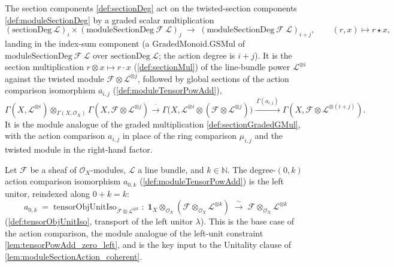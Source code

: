 \begin{definition}
  \label{def:moduleSectionGradedGSMul}
  The section components \cref{def:sectionDeg} act on the twisted-section components
  \cref{def:moduleSectionDeg} by a graded scalar multiplication
  \[
    (\mathrm{sectionDeg}\ \mathcal{L})_i \times
      (\mathrm{moduleSectionDeg}\ \mathcal{F}\ \mathcal{L})_j
    \;\longrightarrow\; (\mathrm{moduleSectionDeg}\ \mathcal{F}\ \mathcal{L})_{i+j},
    \qquad (r, x) \longmapsto r \star x,
  \]
  landing in the index-sum component (a \(\mathrm{GradedMonoid.GSMul}\) of
  \(\mathrm{moduleSectionDeg}\ \mathcal{F}\ \mathcal{L}\) over
  \(\mathrm{sectionDeg}\ \mathcal{L}\); the action degree is \(i+j\)). It is the section multiplication
  \(r \otimes x \mapsto r \cdot x\) (\cref{def:sectionMul}) of the line-bundle power
  \(\mathcal{L}^{\otimes i}\) against the twisted module
  \(\mathcal{F} \otimes \mathcal{L}^{\otimes j}\), followed by global sections of the
  action comparison isomorphism \(a_{i,j}\) (\cref{def:moduleTensorPowAdd}),
  \[
    \Gamma(X, \mathcal{L}^{\otimes i}) \otimes_{\Gamma(X,\mathcal{O}_X)}
      \Gamma(X, \mathcal{F} \otimes \mathcal{L}^{\otimes j})
    \xrightarrow{\ \cdot\ }
    \Gamma\bigl(X, \mathcal{L}^{\otimes i} \otimes
      (\mathcal{F} \otimes \mathcal{L}^{\otimes j})\bigr)
    \xrightarrow{\ \Gamma(a_{i,j})\ }
    \Gamma(X, \mathcal{F} \otimes \mathcal{L}^{\otimes (i+j)}).
  \]
  It is the module analogue of the graded multiplication \cref{def:sectionGradedGMul},
  with the action comparison \(a_{i,j}\) in place of the ring comparison
  \(\mu_{i,j}\) and the twisted module in the right-hand factor.
\end{definition}

\begin{lemma}

  \label{lem:moduleTensorPowAdd_zero_left}
  Let \(\mathcal{F}\) be a sheaf of \(\mathcal{O}_X\)-modules, \(\mathcal{L}\) a line
  bundle, and \(k \in \mathbb{N}\). The degree-\((0,k)\) action comparison
  isomorphism \(a_{0,k}\) (\cref{def:moduleTensorPowAdd}) is the left unitor,
  reindexed along \(0 + k = k\):
  \[
    a_{0,k} \;=\;
      \mathrm{tensorObjUnitIso}_{\mathcal{F}\otimes\mathcal{L}^{\otimes k}}
      \;:\; \mathbf{1}_X \otimes_{\mathcal{O}_X}
        (\mathcal{F}\otimes_{\mathcal{O}_X}\mathcal{L}^{\otimes k})
      \;\xrightarrow{\ \sim\ }\;
      \mathcal{F}\otimes_{\mathcal{O}_X}\mathcal{L}^{\otimes k}
  \]
  (\cref{def:tensorObjUnitIso}, transport of the left unitor \(\lambda\)). This is
  the base case of the action comparison, the module analogue of the left-unit
  constraint \cref{lem:tensorPowAdd_zero_left}, and is the key input to the
  Unitality clause of \cref{lem:moduleSectionAction_coherent}.
\end{lemma}

